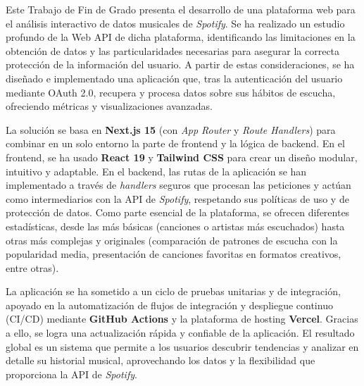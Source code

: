 Este Trabajo de Fin de Grado presenta el desarrollo de una plataforma web para el análisis interactivo de datos musicales de \textit{Spotify}. Se ha realizado un estudio profundo de la Web API de dicha plataforma, identificando las limitaciones en la obtención de datos y las particularidades necesarias para asegurar la correcta protección de la información del usuario. A partir de estas consideraciones, se ha diseñado e implementado una aplicación que, tras la autenticación del usuario mediante OAuth 2.0, recupera y procesa datos sobre sus hábitos de escucha, ofreciendo métricas y visualizaciones avanzadas.

La solución se basa en \textbf{Next.js 15} (con \textit{App Router} y \textit{Route Handlers}) para combinar en un solo entorno la parte de frontend y la lógica de backend. En el frontend, se ha usado \textbf{React 19} y \textbf{Tailwind CSS} para crear un diseño modular, intuitivo y adaptable. En el backend, las rutas de la aplicación se han implementado a través de \textit{handlers} seguros que procesan las peticiones y actúan como intermediarios con la API de \textit{Spotify}, respetando sus políticas de uso y de protección de datos. Como parte esencial de la plataforma, se ofrecen diferentes estadísticas, desde las más básicas (canciones o artistas más escuchados) hasta otras más complejas y originales (comparación de patrones de escucha con la popularidad media, presentación de canciones favoritas en formatos creativos, entre otras).

La aplicación se ha sometido a un ciclo de pruebas unitarias y de integración, apoyado en la automatización de flujos de integración y despliegue continuo (CI/CD) mediante \textbf{GitHub Actions} y la plataforma de hosting \textbf{Vercel}. Gracias a ello, se logra una actualización rápida y confiable de la aplicación. El resultado global es un sistema que permite a los usuarios descubrir tendencias y analizar en detalle su historial musical, aprovechando los datos y la flexibilidad que proporciona la API de \textit{Spotify}.